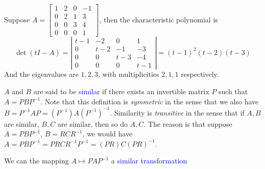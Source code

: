 \documentclass{beamer}
\theoremstyle{definition}
\theoremstyle{remark}
\begin{document}
\begin{frame}[t]
\begin{example}
Suppose $A=\begin{bmatrix}
1&2&0&-1\\
0&2&1&3\\
0&0&3&4\\
0&0&0&1
\end{bmatrix}$, then the characteristic polynomial is\pause
\[
\det(tI-A)=\left|\begin{matrix}
t-1&-2&0&1\\
0&t-2&-1&-3\\
0&0&t-3&-4\\
0&0&0&t-1
\end{matrix}\right|=(t-1)^2(t-2)(t-3)
\]\pause
And the eigenvalues are $1,2,3$, with multiplicities $2,1,1$ respectively.
\end{example}
\end{frame}

\begin{frame}[t]
\begin{definition}
$A$ and $B$ are said to be \textcolor{blue}{similar} if there exists an invertible matrix $P$ such that $A=PBP^{-1}$\pause. Note that this definition is \textit{symmetric} in the sense that we also have $B=P^{-1}AP=(P^{-1})A(P^{-1})^{-1}$\pause. Similarity is \textit{transitive} in the sense that if $A,B$ are similar, $B,C$ are similar, then so do $A,C$\pause. The reason is that suppose $A=PBP^{-1}$, $B=RCR^{-1}$, we would have $A=PBP^{-1}=PRCR^{-1}P^{-1}=(PR)C(PR)^{-1}$.
\end{definition}
\pause
\begin{definition}
We can the mapping $A\mapsto PAP^{-1}$ a \textcolor{blue}{similar transformation}
\end{definition}
\end{frame}
\end{document}
